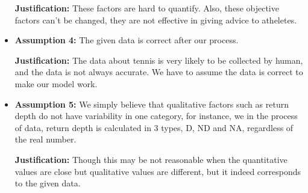 \begin{itemize}
    \textbf{Justification:} These factors are hard to quantify. Also, these objective factors can't be changed, 
    they are not effective in giving advice to atheletes.

    \item \textbf{Assumption 4:} The given data is correct after our process.
    
    \textbf{Justification:} The data about tennis is very likely to be collected
    by human, and the data is not always accurate. We have to assume the data is correct to make our model work.

    \item \textbf{Assumption 5:} We simply believe that qualitative factors such as return depth do not have variability in one category, for instance, we 
    in the process of data, return depth is calculated in 3 types, D, ND and NA, regardless of the real number.
    
    \textbf{Justification:} Though this may be not reasonable when the quantitative values are close but qualitative values are different, but it indeed corresponds to the given data.
\end{itemize}
